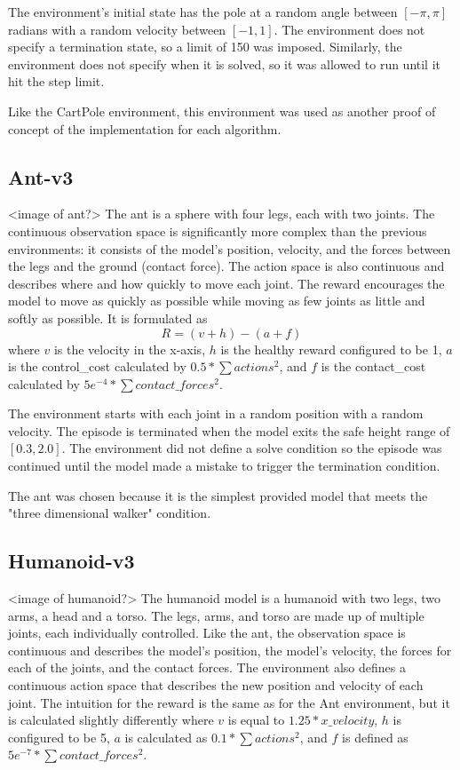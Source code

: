 \documentclass[conference]{IEEEtran}
\begin{document}
The environment's initial state has the pole at a random angle between $[-\pi, \pi]$ radians with a random velocity
between $[-1, 1]$. The environment does not specify a termination state, so a limit of 150 was imposed. Similarly, the
environment does not specify when it is solved, so it was allowed to run until it hit the step limit.

Like the CartPole environment, this environment was used as another proof of concept of the implementation for each
algorithm.

\subsection{Ant-v3}

<image of ant?>
The ant is a sphere with four legs, each with two joints. The continuous observation space is significantly more
complex than the previous environments: it consists of the model's position, velocity, and the forces between the legs
and the ground (contact force). The action space is also continuous and describes where and how quickly to move each
joint. The reward encourages the model to move as quickly as possible while moving as few joints as little and softly as
possible. It is formulated as
$$
    R = (v + h) - (a + f)
$$
where $v$ is the velocity in the x-axis, $h$ is the healthy reward configured to be 1, $a$ is the control\_cost
calculated by $0.5* \sum actions^{2}$, and $f$ is the contact\_cost calculated by
$5e^{-4} * \sum contact\_forces^{2}$.

The environment starts with each joint in a random position with a random velocity. The episode is terminated when the
model exits the safe height range of $[0.3, 2.0]$. The environment did not define a solve condition so the episode was
continued until the model made a mistake to trigger the termination condition.

The ant was chosen because it is the simplest provided model that meets the "three dimensional walker" condition.

\subsection{Humanoid-v3}

<image of humanoid?>
The humanoid model is a humanoid with two legs, two arms, a head and a torso. The legs, arms, and torso are made up of
multiple joints, each individually controlled. Like the ant, the observation space is continuous and describes the
model's position, the model's velocity, the forces for each of the joints, and the contact forces. The environment also
defines a continuous action space that describes the new position and velocity of each joint. The intuition for the
reward is the same as for the Ant environment, but it is calculated slightly differently where $v$ is equal to
$1.25 * x\_velocity$, $h$ is configured to be 5, $a$ is calculated as $0.1 * \sum actions^{2}$, and $f$ is defined as
$5e^{-7} * \sum contact\_forces^{2}$.
\end{document}

